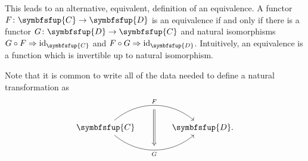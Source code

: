 \documentclass[fleqn]{NotesClass}
\newcommand{\cat}[1]{\symbfsfup{#1}}
\DeclareMathOperator{\id}{id}
\newcommand{\naturalTransformation}{\Rightarrow}
\begin{document}
    This leads to an alternative, equivalent, definition of an equivalence.
    A functor \(F \colon \cat{C} \to \cat{D}\) is an equivalence if and only if there is a functor \(G \colon \cat{D} \to \cat{C}\) and natural isomorphisms \(G \circ F \naturalTransformation \id_{\cat{C}}\) and \(F \circ G \naturalTransformation \id_{\cat{D}}\).
    Intuitively, an equivalence is a function which is invertible up to natural isomorphism.
    
    Note that it is common to write all of the data needed to define a natural transformation as
    \begin{equation}
        \begin{tikzcd}[column sep=large]
            \cat{C}
            \arrow[r, "F"{name=F}, bend left=40]
            \arrow[r, "G"{name=G, swap}, bend right=40]
            & \cat{D}.
            \arrow[Rightarrow, from=F.south, to=G.north-|F, shorten <=5pt, shorten >=5pt]
        \end{tikzcd}
    \end{equation}
    
\end{document}

